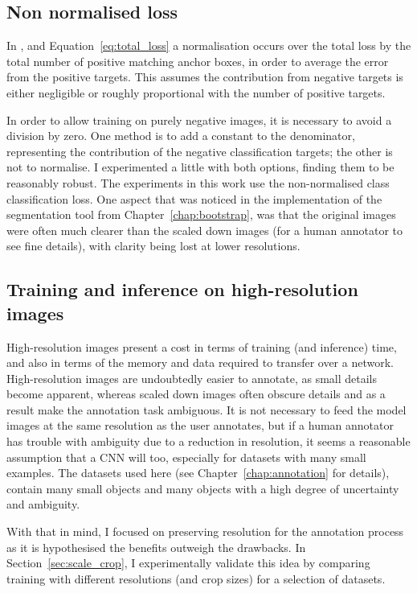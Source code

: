 \subsection {Non normalised loss}
\label{sec:normalisation}

In \cite{Lin2017}, and Equation~\ref{eq:total_loss} a normalisation occurs over the total loss by the total number of positive matching anchor boxes, in order to average the error from the positive targets. This assumes the contribution from negative targets is either negligible or roughly proportional with the number of positive targets.

In order to allow training on purely negative images, it is necessary to avoid a division by zero. One method is to add a constant to the denominator, representing the contribution of the negative classification targets; the other is not to normalise. I experimented a little with both options, finding them to be reasonably robust. The experiments in this work use the non-normalised class classification loss.
One aspect that was noticed in the implementation of the segmentation tool from Chapter~\ref{chap:bootstrap}, was that the original images were often much clearer than the scaled down images (for a human annotator to see fine details), with clarity being lost at lower resolutions. 

\subsection{Training and inference on high-resolution images}
\label{section:high_res}

High-resolution images present a cost in terms of training (and inference) time, and also in terms of the memory and data required to transfer over a network. High-resolution images are undoubtedly easier to annotate, as small details become apparent, whereas scaled down images often obscure details and as a result make the annotation task ambiguous. It is not necessary to feed the model images at the same resolution as the user annotates, but if a human annotator has trouble with ambiguity due to a reduction in resolution, it seems a reasonable assumption that a \gls{CNN} will too, especially for datasets with many small examples. The datasets used here (see Chapter~\ref{chap:annotation} for details), contain many small objects and many objects with a high degree of uncertainty and ambiguity.

With that in mind, I focused on preserving resolution for the annotation process as it is hypothesised the benefits outweigh the drawbacks. In Section~\ref{sec:scale_crop}, I experimentally validate this idea by comparing training with different resolutions (and crop sizes) for a selection of datasets.

